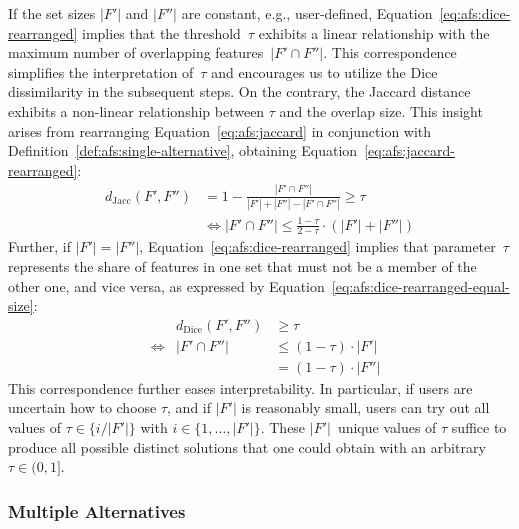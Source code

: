 \documentclass[iicol, sn-basic, Numbered]{sn-jnl} %
\theoremstyle{plain}
\theoremstyle{definition}
\begin{document}
If the set sizes $|F'|$ and $|F''|$ are constant, e.g., user-defined, Equation~\ref{eq:afs:dice-rearranged} implies that the threshold~$\tau$ exhibits a linear relationship with the maximum number of overlapping features~$|F' \cap F''|$.
This correspondence simplifies the interpretation of~$\tau$ and encourages us to utilize the Dice dissimilarity in the subsequent steps.
On the contrary, the Jaccard distance exhibits a non-linear relationship between $\tau$ and the overlap size.
This insight arises from rearranging Equation~\ref{eq:afs:jaccard} in conjunction with Definition~\ref{def:afs:single-alternative}, obtaining Equation~\ref{eq:afs:jaccard-rearranged}:
%
\begin{equation}
	\begin{aligned}
		d_{\text{Jacc}}(F',F'') & = 1 - \frac{|F' \cap F''|}{|F'| + |F''| - |F' \cap F''|} \geq \tau \\
		& \Leftrightarrow |F' \cap F''| \leq \frac{1 - \tau}{2 - \tau} \cdot (|F'| + |F''|)
	\end{aligned}
	\label{eq:afs:jaccard-rearranged}
\end{equation}
%
Further, if $|F'| = |F''|$, Equation~\ref{eq:afs:dice-rearranged} implies that parameter~$\tau$ represents the share of features in one set that must not be a member of the other one, and vice versa, as expressed by Equation~\ref{eq:afs:dice-rearranged-equal-size}:
%
\begin{equation}
	\begin{aligned}
		& & d_{\text{Dice}}(F',F'') & \geq \tau \\
		& \Leftrightarrow & |F' \cap F''| & \leq (1 - \tau) \cdot |F'| \\
		& & & = (1 - \tau) \cdot |F''|
	\end{aligned}
	\label{eq:afs:dice-rearranged-equal-size}
\end{equation}
%
This correspondence further eases interpretability.
In particular, if users are uncertain how to choose $\tau$, and if $|F'|$ is reasonably small, users can try out all values of $\tau \in \{i / |F'|\}$ with $i \in \{1, \dots, |F'|\}$.
These $|F'|$~unique values of $\tau$ suffice to produce all possible distinct solutions that one could obtain with an arbitrary $\tau \in (0,1]$.

\subsubsection{Multiple Alternatives}
\label{sec:afs:approach:constraints:multiple}
\end{document}
